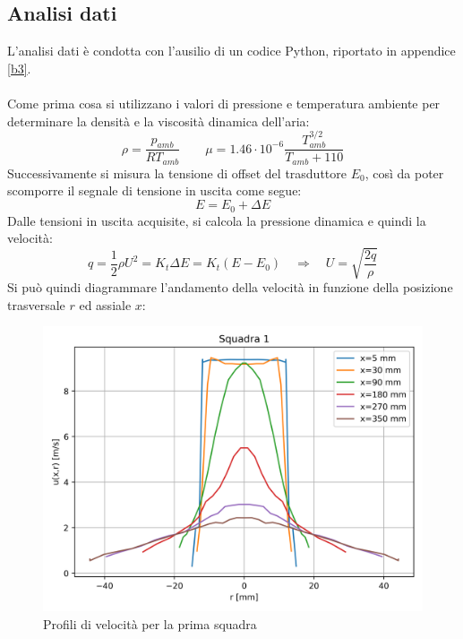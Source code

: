 \subsection{Analisi dati}
L'analisi dati è condotta con l'ausilio di un codice Python, riportato in appendice \ref{b3}.\\\\
Come prima cosa si utilizzano i valori di pressione e temperatura ambiente per determinare la densità e la viscosità dinamica dell'aria:
\begin{equation*}
    \rho = \frac{p_{amb}}{R T_{amb}} \qquad \mu = 1.46\cdot10^{-6} \frac{T_{amb}^{3/2}}{T_{amb}+110}
\end{equation*}
Successivamente si misura la tensione di offset del trasduttore $E_0$, così da poter scomporre il segnale di tensione in uscita come segue:
\begin{equation*}
    E = E_0 + \Delta E
\end{equation*}
Dalle tensioni in uscita acquisite, si calcola la pressione dinamica e quindi la velocità:
\begin{equation*}
    q = \frac12 \rho U^2 = K_t \Delta E = K_t (E - E_0) \quad \Rightarrow \quad U = \sqrt{\frac{2q}\rho}
\end{equation*}
Si può quindi diagrammare l'andamento della velocità in funzione della posizione trasversale $r$ ed assiale $x$:
\begin{figure}[H]
    \centering
    \includegraphics[width=.9\textwidth]{images/3/sq1.png}
    \caption{Profili di velocità per la prima squadra}
\end{figure}
